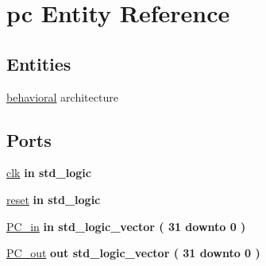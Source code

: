 \hypertarget{classpc}{\section{pc \-Entity \-Reference}
\label{classpc}
}
\subsection*{\-Entities}
\begin{DoxyCompactItemize}
\item 
\hyperlink{classpc_1_1behavioral}{behavioral} architecture
\end{DoxyCompactItemize}
\*
\*
\subsection*{\-Ports}
 \begin{DoxyCompactItemize}
\item 
\hyperlink{classpc_a66122f468837e0c758d57582b68eb123}{clk}  {\bfseries {\bfseries in }} {\bfseries std\-\_\-logic } 
\item 
\hyperlink{classpc_ab46b7d3d37e6c21a29a6f2a207682d72}{reset}  {\bfseries {\bfseries in }} {\bfseries std\-\_\-logic } 
\item 
\hyperlink{classpc_add4c01f1cc397a05cf5ad7aa3b694cea}{\-P\-C\-\_\-in}  {\bfseries {\bfseries in }} {\bfseries std\-\_\-logic\-\_\-vector (   31    downto    0  ) } 
\item 
\hyperlink{classpc_ad400ac7e764014280c356d0bc1034caa}{\-P\-C\-\_\-out}  {\bfseries {\bfseries out }} {\bfseries std\-\_\-logic\-\_\-vector (   31    downto    0  ) } 
\end{DoxyCompactItemize}


